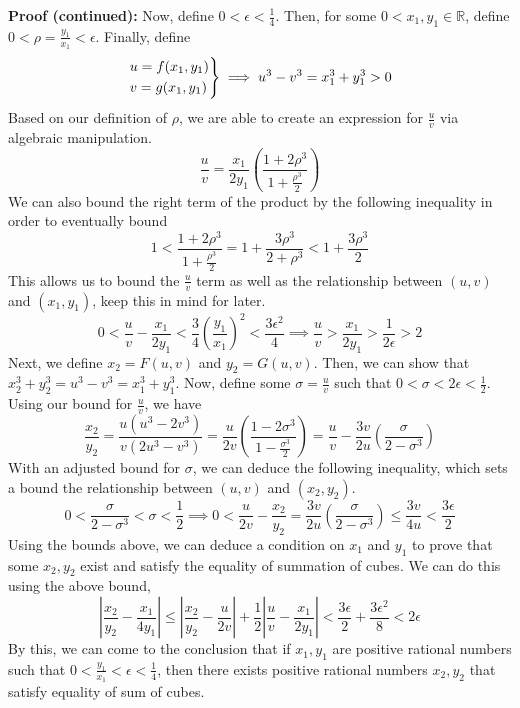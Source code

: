 \begin{boxedsection}

    \textbf{Proof (continued):} Now, define $0< \epsilon < \frac{1}{4}$. Then, for some $0 < x_1, y_1 \in \mathbb{R}$, define $0 < \rho = \frac{y_1}{x_1} < \epsilon$. Finally, define 
    $$
    \begin{rcases}
        u = f(x_1,y_1) \\
        v = g(x_1,y_1) 
    \end{rcases} \implies u^3 - v^3 = x_1^3 + y_1^3 > 0 
    $$
    Based on our definition of $\rho$, we are able to create an expression for $\frac{u}{v}$ via algebraic manipulation.
    $$
    \frac{u}{v} = \frac{x_1}{2y_1} \left(\frac{1 + 2\rho^3}{1+\frac{\rho^3}{2}}\right)
    $$
    We can also bound the right term of the product by the following inequality in order to eventually bound 
    $$
    1 < \frac{1 + 2\rho^3}{1+\frac{\rho^3}{2}} = 1 + \frac{3\rho^3}{2 + \rho^3} < 1 + \frac{3\rho^3}{2}
    $$
    This allows us to bound the $\frac{u}{v}$ term as well as the relationship between $(u,v)$ and $(x_1,y_1)$, keep this in mind for later.
    $$
    0 < \frac{u}{v} - \frac{x_1}{2y_1} < \frac{3}{4} \left(\frac{y_1}{x_1}\right)^2 < \frac{3\epsilon^2}{4} \implies \frac{u}{v} > \frac{x_1}{2y_1} > \frac{1}{2\epsilon} > 2
    $$
    Next, we define $x_2 = F(u,v)$ and $y_2 = G(u,v)$. Then, we can show that $x_2^3 + y_2^3 = u^3 - v^3 = x_1^3 + y_1^3$. Now, define some $\sigma = \frac{u}{v}$ such that $0 < \sigma < 2\epsilon < \frac{1}{2}$. Using our bound for $\frac{u}{v}$, we have
    $$
    \frac{x_2}{y_2} = \frac{u(u^3 - 2v^3)}{v(2u^3 - v^3)} = \frac{u}{2v}\left(\frac{1-2\sigma^3}{1-\frac{\sigma^3}{2}}\right) = \frac{u}{v} - \frac{3v}{2u}\left(\frac{\sigma}{2-\sigma^3}\right)
    $$
    With an adjusted bound for $\sigma$, we can deduce the following inequality, which sets a bound the relationship between $(u,v)$ and $(x_2,y_2)$.
    $$
    0 < \frac{\sigma}{2 - \sigma^3} < \sigma < \frac{1}{2} \implies 0 < \frac{u}{2v} - \frac{x_2}{y_2} = \frac{3v}{2u}\left(\frac{\sigma}{2-\sigma^3}\right) \leq \frac{3v}{4u} < \frac{3\epsilon}{2}
    $$
    Using the bounds above, we can deduce a condition on $x_1$ and $y_1$ to prove that some $x_2, y_2$ exist and satisfy the equality of summation of cubes. We can do this using the above bound,
    $$
    \left|\frac{x_2}{y_2} - \frac{x_1}{4y_1} \right| \leq \left|\frac{x_2}{y_2} - \frac{u}{2v}\right| + \frac{1}{2} \left|\frac{u}{v} - \frac{x_1}{2y_1}\right| < \frac{3\epsilon}{2} + \frac{3\epsilon^2}{8} < 2\epsilon
    $$
    By this, we can come to the conclusion that if $x_1, y_1$ are positive rational numbers such that $0 < \frac{y_1}{x_1} < \epsilon < \frac{1}{4}$, then there exists positive rational numbers $x_2, y_2$ that satisfy equality of sum of cubes. 

\end{boxedsection}
